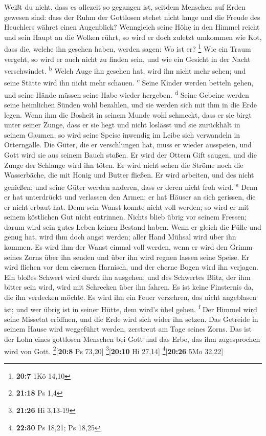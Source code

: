  Weißt du nicht, dass es allezeit so gegangen ist, seitdem
Menschen auf Erden gewesen sind:  dass der Ruhm der
Gottlosen stehet nicht lange und die Freude des Heuchlers währet einen
Augenblick?  Wenngleich seine Höhe in den Himmel reicht
und sein Haupt an die Wolken rührt,  so wird er doch
zuletzt umkommen wie Kot, dass die, welche ihn gesehen haben, werden
sagen: Wo ist er? \footnote{\textbf{20:7} 1Kö 14,10}  Wie
ein Traum vergeht, so wird er auch nicht zu finden sein, und wie ein
Gesicht in der Nacht verschwindet. \textsuperscript{b} 
Welch Auge ihn gesehen hat, wird ihn nicht mehr sehen; und seine Stätte
wird ihn nicht mehr schauen. \textsuperscript{c}  Seine
Kinder werden betteln gehen, und seine Hände müssen seine Habe wieder
hergeben. \textsuperscript{d}  Seine Gebeine werden seine
heimlichen Sünden wohl bezahlen, und sie werden sich mit ihm in die Erde
legen.  Wenn ihm die Bosheit in seinem Munde wohl
schmeckt, dass er sie birgt unter seiner Zunge,  dass er
sie hegt und nicht loslässt und sie zurückhält in seinem Gaumen,
 so wird seine Speise inwendig im Leibe sich verwandeln
in Otterngalle.  Die Güter, die er verschlungen hat, muss
er wieder ausspeien, und Gott wird sie aus seinem Bauch stoßen.
 Er wird der Ottern Gift saugen, und die Zunge der
Schlange wird ihn töten.  Er wird nicht sehen die Ströme
noch die Wasserbäche, die mit Honig und Butter fließen. 
Er wird arbeiten, und des nicht genießen; und seine Güter werden
anderen, dass er deren nicht froh wird. \textsuperscript{e}
 Denn er hat unterdrückt und verlassen den Armen; er hat
Häuser an sich gerissen, die er nicht erbaut hat.  Denn
sein Wanst konnte nicht voll werden; so wird er mit seinem köstlichen
Gut nicht entrinnen.  Nichts blieb übrig vor seinem
Fressen; darum wird sein gutes Leben keinen Bestand haben.
 Wenn er gleich die Fülle und genug hat, wird ihm doch
angst werden; aller Hand Mühsal wird über ihn kommen.  Es
wird ihm der Wanst einmal voll werden, wenn er wird den Grimm seines
Zorns über ihn senden und über ihn wird regnen lassen seine Speise.
 Er wird fliehen vor dem eisernen Harnisch, und der
eherne Bogen wird ihn verjagen.  Ein bloßes Schwert wird
durch ihn ausgehen; und des Schwertes Blitz, der ihm bitter sein wird,
wird mit Schrecken über ihn fahren.  Es ist keine
Finsternis da, die ihn verdecken möchte. Es wird ihn ein Feuer
verzehren, das nicht angeblasen ist; und wer übrig ist in seiner Hütte,
dem wird's übel gehen. \textsuperscript{f}  Der Himmel
wird seine Missetat eröffnen, und die Erde wird sich wider ihn setzen.
 Das Getreide in seinem Hause wird weggeführt werden,
zerstreut am Tage seines Zorns.  Das ist der Lohn eines
gottlosen Menschen bei Gott und das Erbe, das ihm zugesprochen wird von
Gott. \footnote{\textbf{21:18} Ps 1,4}{[}\textbf{20:8} Ps 73,20{]}
\footnote{\textbf{21:26} Hi 3,13-19}{[}\textbf{20:10} Hi 27,14{]}
\footnote{\textbf{22:30} Ps 18,21; Ps 18,25}{[}\textbf{20:26} 5Mo
32,22{]}


